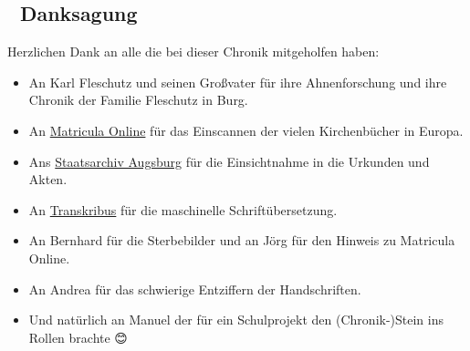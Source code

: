 \documentclass[
]{article}
\begin{document}
\subsection{👏 Danksagung}\label{header-n388}

Herzlichen Dank an alle die bei dieser Chronik mitgeholfen haben:

\begin{itemize}
\item
  An Karl Fleschutz und seinen Großvater für ihre Ahnenforschung und
  ihre Chronik der Familie Fleschutz in Burg.
\item
  An \href{https://data.matricula-online.eu/de/}{Matricula Online} für
  das Einscannen der vielen Kirchenbücher in Europa.
\item
  Ans \href{https://www.gda.bayern.de/augsburg}{Staatsarchiv Augsburg}
  für die Einsichtnahme in die Urkunden und Akten.
\item
  An
  \href{https://www.transkribus.org/de/kurrentschrift-uebersetzen}{Transkribus}
  für die maschinelle Schriftübersetzung.
\item
  An Bernhard für die Sterbebilder und an Jörg für den Hinweis zu
  Matricula Online.
\item
  An Andrea für das schwierige Entziffern der Handschriften.
\item
  Und natürlich an Manuel der für ein Schulprojekt den (Chronik-)Stein
  ins Rollen brachte 😊
\end{itemize}
\end{document}
